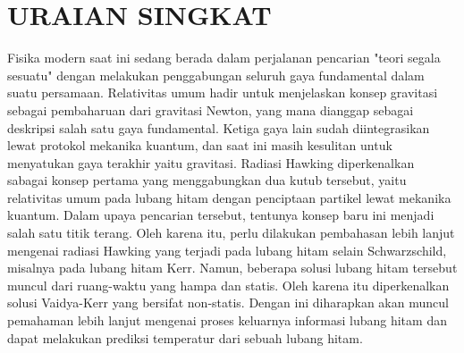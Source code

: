 \section*{\centering URAIAN SINGKAT}
Fisika modern saat ini sedang berada dalam perjalanan pencarian "teori segala sesuatu" dengan melakukan penggabungan seluruh gaya fundamental dalam suatu persamaan. Relativitas umum hadir untuk menjelaskan konsep gravitasi sebagai pembaharuan dari gravitasi Newton, yang mana dianggap sebagai deskripsi salah satu gaya fundamental. Ketiga gaya lain sudah diintegrasikan lewat protokol mekanika kuantum, dan saat ini masih kesulitan untuk menyatukan gaya terakhir yaitu gravitasi. Radiasi Hawking diperkenalkan sabagai konsep pertama yang menggabungkan dua kutub tersebut, yaitu relativitas umum pada lubang hitam dengan penciptaan partikel lewat mekanika kuantum. Dalam upaya pencarian tersebut, tentunya konsep baru ini menjadi salah satu titik terang. Oleh karena itu, perlu dilakukan pembahasan lebih lanjut mengenai radiasi Hawking yang terjadi pada lubang hitam selain Schwarzschild, misalnya pada lubang hitam Kerr. Namun, beberapa solusi lubang hitam tersebut muncul dari ruang-waktu yang hampa dan statis. Oleh karena itu diperkenalkan solusi Vaidya-Kerr yang bersifat non-statis. Dengan ini diharapkan akan muncul pemahaman lebih lanjut mengenai proses keluarnya informasi lubang hitam dan dapat melakukan prediksi temperatur dari sebuah lubang hitam.